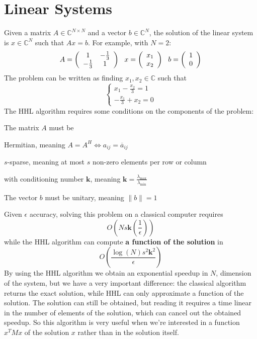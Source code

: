 \documentclass[10pt]{article}
\begin{document}
\section{Linear Systems}
Given a matrix $A \in \mathbb{C}^{N\times N}$ and a vector $b\in \mathbb{C}^{N}$, the solution of the linear system is $x\in \mathbb{C}^{N}$ such that $Ax = b$. For example, with $N=2$:
$$A=\left(\begin{array}{c c}
1&-\frac{1}{3}\\-\frac{1}{3}&1
\end{array}\right)\:\:\:x=\left(\begin{array}{c}
x_1\\x_2
\end{array}\right)\:\:\:b=\left(\begin{array}{c}
1\\0
\end{array}\right)$$
The problem can be written as finding $x_1,x_2\in\mathbb{C}$ such that
$$\left\{\begin{array}{l}
\displaystyle x_1-\frac{x_2}{3}=1\\
\displaystyle -\frac{x_1}{3}+x_2=0
\end{array}\right.$$
The HHL algorithm requires some conditions on the components of the problem:
\begin{list}{}{}
	\item The matrix $A$ must be
	\begin{list}{}{}
		\item Hermitian, meaning $A = A^H \Leftrightarrow a_{ij} = \overline{a}_{ij}$
		\item $s$-sparse, meaning at most $s$ non-zero elements per row or column
		\item with conditioning number $\mathbf{k}$, meaning $\mathbf{k}=\frac{\lambda_{\text{max}}}{\lambda_{\text{min}}}$ %
	\end{list}
	\item The vector $b$ must be unitary, meaning $\|b\|=1$
\end{list}
Given $\epsilon$ accuracy, solving this problem on a classical computer requires $$O\left(Ns\mathbf{k}\left(\frac{1}{\epsilon}\right)\right)$$ while the HHL algorithm can compute \textbf{a function of the solution} in $$O\left(\frac{\log(N)s^2\mathbf{k}^2}{\epsilon}\right)$$
By using the HHL algorithm we obtain an exponential speedup in $N$, dimension of the system, but we have a very important difference: the classical algorithm returns the exact solution, while HHL can only approximate a function of the solution. The solution can still be obtained, but reading it requires a time linear in the number of elements of the solution, which can cancel out the obtained speedup. So this algorithm is very useful when we're interested in a function $x^TMx$ of the solution $x$ rather than in the solution itself.
\end{document}

